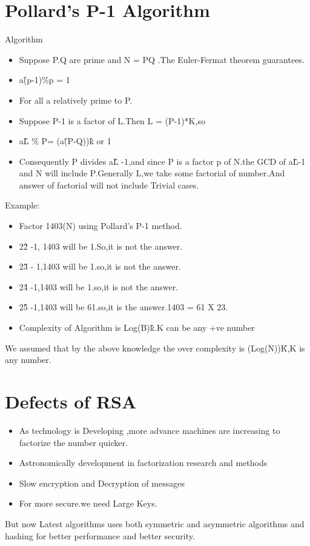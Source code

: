 \documentclass[12pt,a4paper]{report}
\begin{document}
\section*{Pollard's P-1 Algorithm}
Algorithm
\begin{itemize}
\item Suppose P.Q are prime and N = PQ .The Euler-Fermat theorem guarantees.
\item a\^(p-1)\%p = 1
\item For all a relatively prime to P.
\item Suppose P-1 is a factor of L.Then L = (P-1)*K,so
\item a\^L \% P= (a\^(P-Q))\^k or 1
\item Consequently P divides a\^L -1,and since P is a factor p of N.the GCD of a\^L-1 and N will include P.Generally L,we take some factorial of number.And answer of factorial will not include Trivial cases.
\end{itemize}
Example:
\begin{itemize}
\item Factor 1403(N) using Pollard's P-1 method.
\item 2\^2 -1, 1403 will be 1.So,it is not the answer.
\item 2\^3 - 1,1403 will be 1.so,it is not the answer.
\item 2\^4 -1,1403 will be  1.so,it is not the answer.
\item 2\^5 -1,1403 will be 61.so,it is the answer.1403 = 61 X 23.
\item Complexity of Algorithm is Log(B)\^k.K can be any +ve number
\end{itemize}
We assumed that by the above knowledge the over complexity is (Log(N))\^K,K is any number.
\section{Defects of RSA}
\begin{itemize}
\item As technology is Developing ,more advance machines are increasing to factorize the number quicker.
\item Astronomically development in factorization research and methods
\item Slow encryption and Decryption of messages
\item For more secure.we need Large Keys.
\end{itemize}
But now Latest algorithms uses both symmetric and asymmetric algorithms and hashing for better performance and better security.
\end{document}
